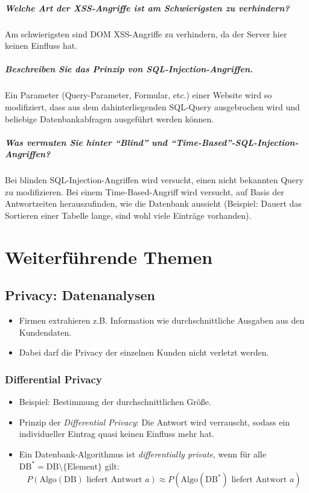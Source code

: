 		\paragraph{Welche Art der XSS-Angriffe ist am Schwierigsten zu verhindern?}
			Am schwierigsten sind DOM XSS-Angriffe zu verhindern, da der Server hier keinen Einfluss hat.

		\paragraph{Beschreiben Sie das Prinzip von SQL-Injection-Angriffen.}
			Ein Parameter (Query-Parameter, Formular, etc.) einer Website wird so modifiziert, dass aus dem dahinterliegenden SQL-Query ausgebrochen wird und beliebige Datenbankabfragen ausgeführt werden können.

		\paragraph{Was vermuten Sie hinter \enquote{Blind} und \enquote{Time-Based}-SQL-Injection-Angriffen?}
			Bei blinden SQL-Injection-Angriffen wird versucht, einen nicht bekannten Query zu modifizieren. Bei einem Time-Based-Angriff wird versucht, auf Basis der Antwortzeiten herauszufinden, wie die Datenbank aussieht (Beispiel: Dauert das Sortieren einer Tabelle lange, sind wohl viele Einträge vorhanden).

\chapter{Weiterführende Themen}
	\section{Privacy: Datenanalysen}
		\begin{itemize}
			\item Firmen extrahieren z.B. Information wie durchschnittliche Ausgaben aus den Kundendaten.
			\item Dabei darf die Privacy der einzelnen Kunden nicht verletzt werden.
		\end{itemize}

		\subsection{Differential Privacy}
			\begin{itemize}
				\item Beispiel: Bestimmung der durchschnittlichen Größe.
				\item Prinzip der \textit{Differential Privacy}: Die Antwort wird verrauscht, sodass ein individueller Eintrag quasi keinen Einfluss mehr hat.
				\item Ein Datenbank-Algorithmus ist \textit{differentially private}, wenn für alle \( \textrm{DB}^* = \textrm{DB} \setminus \{ \textrm{Element} \} \) gilt:
					\begin{equation*}
						P(\textrm{Algo}(\textrm{DB}) \textrm{ liefert Antwort } a) \approx P(\textrm{Algo}(\textrm{DB}^*) \textrm{ liefert Antwort } a)
					\end{equation*}
			\end{itemize}

